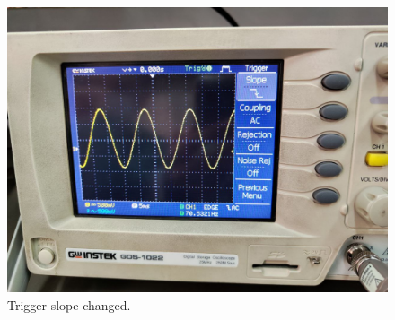 \documentclass[11pt]{article}
\newcommand{\PicScale}{0.2}
\begin{document}
\begin{question}
{        \begin{figure}[H]
            \begin{center}
                \includegraphics[scale=\PicScale]{Fig/52.jpeg}
                \caption{Trigger slope changed.}
            \end{center}
        \end{figure}

}
\end{question}
\end{document}
